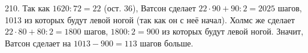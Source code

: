 210. Так как $1620:72=22$ (ост. 36), Ватсон сделает $22\cdot90+90:2=2025$ шагов, 1013 из которых будут левой ногой (так как он с неё начал). Холмс же сделает $22\cdot80+80:2=1800$ шагов, $1800:2=900$ из которых будут левой ногой. Значит, Ватсон сделает на $1013-900=113$ шагов больше.\\
